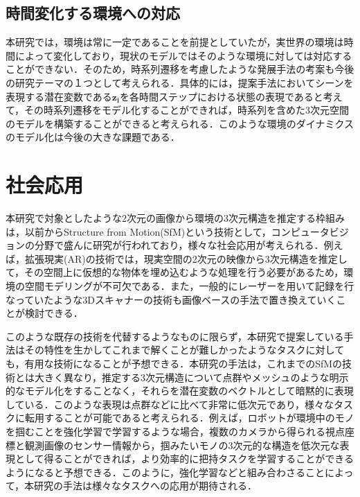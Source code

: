 \subsection{時間変化する環境への対応}
本研究では，環境は常に一定であることを前提としていたが，実世界の環境は時間によって変化しており，現状のモデルではそのような環境に対しては対応することができない．そのため，時系列遷移を考慮したような発展手法の考案も今後の研究テーマの１つとして考えられる．具体的には，提案手法においてシーンを表現する潜在変数である$\bm{z_i}$を各時間ステップにおける状態の表現であると考えて，その時系列遷移をモデル化することができれば，時系列を含めた3次元空間のモデルを構築することができると考えられる．このような環境のダイナミクスのモデル化は今後の大きな課題である．

\section{社会応用}
本研究で対象としたような2次元の画像から環境の3次元構造を推定する枠組みは，以前からStructure from Motion(SfM)という技術として，コンピュータビジョンの分野で盛んに研究が行われており，様々な社会応用が考えられる．例えば，拡張現実(AR)の技術では，現実空間の2次元の映像から3次元構造を推定して，その空間上に仮想的な物体を埋め込むような処理を行う必要があるため，環境の空間モデリングが不可欠である．また，一般的にレーザーを用いて記録を行なっていたような3Dスキャナーの技術も画像ベースの手法で置き換えていくことが検討できる．

このような既存の技術を代替するようなものに限らず，本研究で提案している手法はその特性を生かしてこれまで解くことが難しかったようなタスクに対しても，有用な技術になることが予想できる．本研究の手法は，これまでのSfMの技術とは大きく異なり，推定する3次元構造について点群やメッシュのような明示的なモデル化をすることなく，それらを潜在変数のベクトルとして暗黙的に表現している．このような表現は点群などに比べて非常に低次元であり，様々なタスクに転用することが可能であると考えられる．例えば，ロボットが環境中のモノを掴むことを強化学習で学習するような場合，複数のカメラから得られる視点座標と観測画像のセンサー情報から，掴みたいモノの3次元的な構造を低次元な表現として得ることができれば，より効率的に把持タスクを学習することができるようになると予想できる．このように，強化学習などと組み合わさることによって，本研究の手法は様々なタスクへの応用が期待される．

